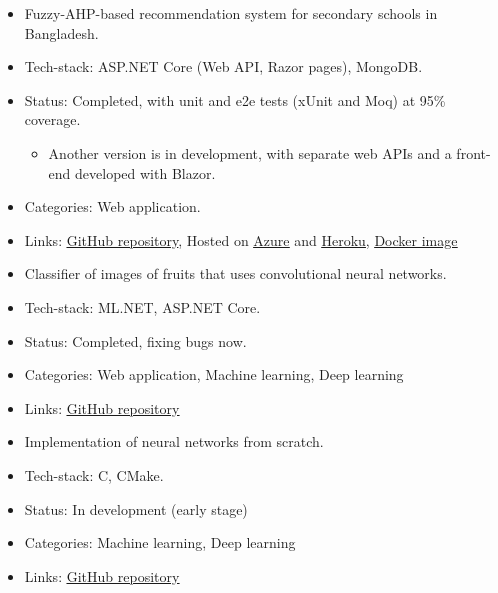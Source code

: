 \begin{itemize}
\item Fuzzy-AHP-based recommendation system for secondary schools in Bangladesh.
\item Tech-stack: ASP.NET Core (Web API, Razor pages), MongoDB.
\item Status: Completed, with unit and e2e tests (xUnit and Moq) at 95\% coverage.
\begin{itemize}
    \item Another version is in development, with separate web APIs and a front-end developed with Blazor.
\end{itemize}
\item Categories: Web application.
\item Links: \href{https://github.com/maacpiash/KonSchool}{\underline{GitHub repository}}, Hosted on  \href{https://konschool.azurewebsites.net/}{\underline{Azure}} and \href{https://konschool.herokuapp.com}{\underline{Heroku}}, \href{https://hub.docker.com/r/maacpiash/konschool}{\underline{Docker image}}
\end{itemize}
\smallskip
{}
\begin{itemize}
\item Classifier of images of fruits that uses convolutional neural networks.
\item Tech-stack: ML.NET, ASP.NET Core.
\item Status: Completed, fixing bugs now.
\item Categories: Web application, Machine learning, Deep learning
\item Links: \href{https://github.com/maacpiash/Connery}{\underline{GitHub repository}}
\end{itemize}
\smallskip
{}
\begin{itemize}
\item Implementation of neural networks from scratch.
\item Tech-stack: C, CMake.
\item Status: In development (early stage)
\item Categories: Machine learning, Deep learning
\item Links: \href{https://github.com/maacpiash/Winston}{\underline{GitHub repository}}
\end{itemize}
\smallskip
